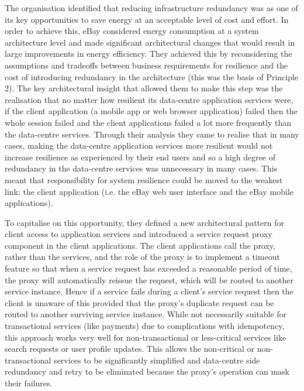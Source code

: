 The organisation identified that reducing infrastructure redundancy was as one of its key opportunities to save energy at an acceptable level of cost and effort. In order to achieve this, eBay considered energy consumption at a system architecture level and made significant architectural changes that would result in large improvements in energy efficiency.  They achieved this by reconsidering the assumptions and tradeoffs between business requirements for resilience and the cost of introducing redundancy in the architecture (this was the basis of Principle 2).  The key architectural insight that allowed them to make this step was the realisation that no matter how resilient its data-centre application services were, if the client application (a mobile app or web browser application) failed then the whole session failed and the client applications failed a lot more frequently than the data-centre services.  Through their analysis they came to realise that in many cases, making the data-centre application services more resilient would not increase resilience as experienced by their end users and so a high degree of redundancy in the data-centre services was unnecessary in many cases. This meant that responsibility for system resilience could be moved to the weakest link: the client application (i.e. the eBay web user interface and the eBay mobile applications).

To capitalise on this opportunity, they defined a new architectural pattern for client access to application services and introduced a service request proxy component in the client applications. The client applications call the proxy, rather than the services, and the role of the proxy is to implement a timeout feature so that when a service request has exceeded a reasonable period of time, the proxy will automatically reissue the request, which will be routed to another service instance.  Hence if a service fails during a client's service request then the client is unaware of this provided that the proxy's duplicate request can be routed to another surviving service instance.  While not necessarily suitable for transactional services (like payments) due to complications with idempotency, this approach works very well for non-transactional or less-critical services like search requests or user profile updates.  This allows the non-critical or non-transactional services to be significantly simplified and data-centre side redundancy and retry to be eliminated because the proxy's operation can mask their failures.

